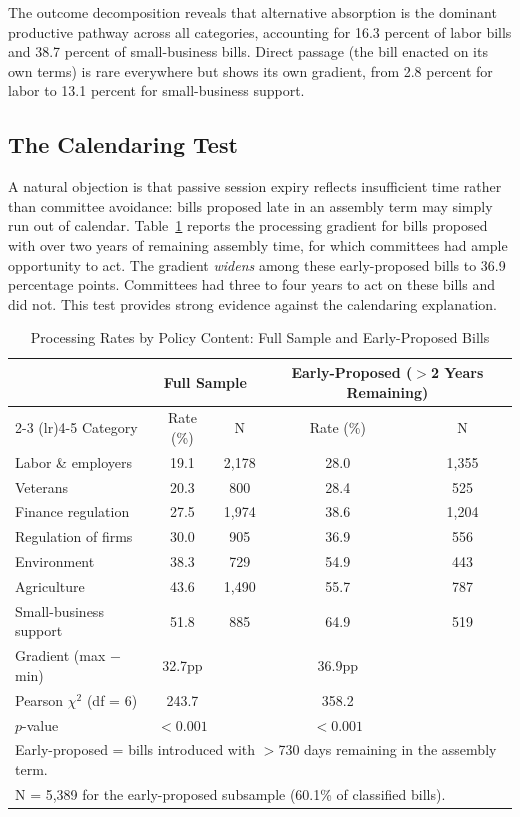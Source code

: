 \documentclass[11pt]{article}
\begin{document}
The outcome decomposition reveals that alternative absorption is the dominant productive pathway across all categories, accounting for 16.3 percent of labor bills and 38.7 percent of small-business bills. Direct passage (the bill enacted on its own terms) is rare everywhere but shows its own gradient, from 2.8 percent for labor to 13.1 percent for small-business support.

\subsection{The Calendaring Test}

A natural objection is that passive session expiry reflects insufficient time rather than committee avoidance: bills proposed late in an assembly term may simply run out of calendar. Table~\ref{tab:main} reports the processing gradient for bills proposed with over two years of remaining assembly time, for which committees had ample opportunity to act. The gradient \textit{widens} among these early-proposed bills to 36.9 percentage points. Committees had three to four years to act on these bills and did not. This test provides strong evidence against the calendaring explanation.

\begin{table}[htbp]
\centering
\caption{Processing Rates by Policy Content: Full Sample and Early-Proposed Bills}
\label{tab:main}
\begin{tabular}{lcccc}
\toprule
& \multicolumn{2}{c}{Full Sample} & \multicolumn{2}{c}{Early-Proposed ($>$2 Years Remaining)} \\
\cmidrule(lr){2-3} \cmidrule(lr){4-5}
Category & Rate (\%) & N & Rate (\%) & N \\
\midrule
Labor \& employers    & 19.1 & 2,178 & 28.0 & 1,355 \\
Veterans              & 20.3 &   800 & 28.4 &   525 \\
Finance regulation    & 27.5 & 1,974 & 38.6 & 1,204 \\
Regulation of firms   & 30.0 &   905 & 36.9 &   556 \\
Environment           & 38.3 &   729 & 54.9 &   443 \\
Agriculture           & 43.6 & 1,490 & 55.7 &   787 \\
Small-business support& 51.8 &   885 & 64.9 &   519 \\
\midrule
Gradient (max $-$ min) & 32.7pp & & 36.9pp & \\
Pearson $\chi^2$ (df = 6) & 243.7 & & 358.2 & \\
$p$-value              & $<0.001$ & & $<0.001$ & \\
\bottomrule
\multicolumn{5}{l}{\footnotesize Early-proposed = bills introduced with $>$730 days remaining in the assembly term.} \\
\multicolumn{5}{l}{\footnotesize N = 5,389 for the early-proposed subsample (60.1\% of classified bills).} \\
\end{tabular}
\end{table}
\end{document}
